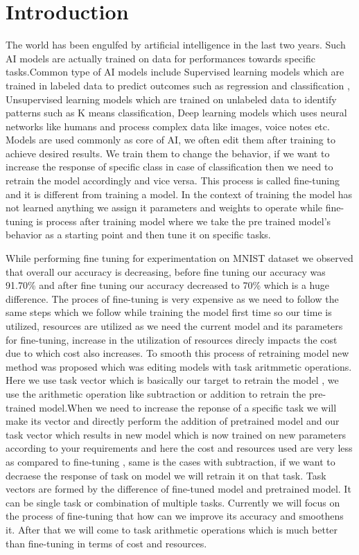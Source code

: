 \documentclass[conference]{IEEEtran}
\begin{document}
\section{Introduction}
The world has been engulfed by artificial intelligence in the last two years. Such AI models are actually trained on data for performances towards specific tasks.Common type of AI models include Supervised learning models which are trained in labeled data to predict outcomes such as regression and classification , Unsupervised learning models  which are trained on unlabeled data to identify patterns such as K means classification, Deep learning models which uses neural networks like humans and process complex data like images, voice notes etc. Models are used commonly as core of AI, we often edit them after training to achieve desired results. We train them to change the behavior, if we want to increase the response of specific class in case of classification then we need to retrain the model accordingly and vice versa. This process is called fine-tuning and it is different from training a model. In the context of training the model has not learned anything we assign it parameters and weights to operate while fine-tuning is process after training model where we take the pre trained model’s behavior as a starting point and then tune it on specific tasks. 

While performing fine tuning for experimentation on MNIST dataset we observed that overall our accuracy is decreasing, before fine tuning our accuracy was 91.70\% and after fine tuning our accuracy decreased to 70\% which is a huge difference. The proces of fine-tuning is very expensive as we need to follow the same steps which we follow while training the model first time so our time is utilized, resources are utilized as we need the current model and its parameters for fine-tuning, increase in the utilization of resources direcly impacts the cost due to which cost also increases. To smooth this process of retraining model new method was proposed which was editing models with task aritmmetic operations\cite{paper-1}. Here we use task vector which is basically our target to retrain the model , we use the arithmetic operation like subtraction or addition to retrain the pre-trained model.When we need to increase the reponse of a specific task we will make its vector and directly perform the addition of pretrained model and our task vector which results in new model which is now trained on new parameters according to your requirements and here the cost and resources used are very less as compared to fine-tuning , same is the cases with subtraction, if we want to decraese the response of task on model we will retrain it on that task. Task vectors are formed by the difference of fine-tuned model and pretrained model. It can be single task or combination of multiple tasks. Currently we will focus on the process of fine-tuning that how can we improve its accuracy and smoothens it. After that we will come to task arithmetic operations which is much better than fine-tuning in terms of cost and resources. 
\end{document}
